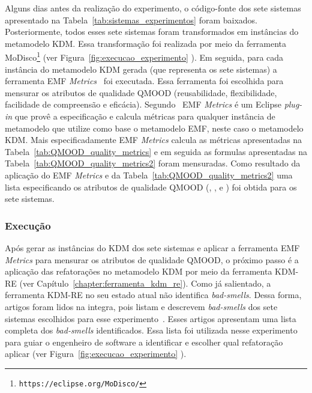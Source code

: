 Alguns dias antes da realização do experimento, o código-fonte dos sete sistemas apresentado na Tabela~\ref{tab:sistemas_experimentos} foram baixados. Posteriormente, todos esses sete sistemas foram transformados em instâncias do metamodelo KDM. Essa transformação foi realizada por meio da ferramenta MoDisco\footnote{\texttt{https://eclipse.org/MoDisco/}} (ver Figura~\ref{fig:execucao_experimento} ). Em seguida, para cada instância do metamodelo KDM gerada (que representa os sete sistemas) a ferramenta EMF \textit{Metrics}~\cite{Arendt_2012, Thorsten_2010_durelli} foi executada. Essa ferramenta foi escolhida para mensurar os atributos de qualidade QMOOD (reusabilidade, flexibilidade, facilidade de compreensão e eficácia). Segundo~ EMF \textit{Metrics} é um Eclipse \textit{plug-in} que provê a especificação e calcula métricas para qualquer instância de metamodelo que utilize como base o metamodelo EMF, neste caso o metamodelo KDM. Mais especificadamente EMF \textit{Metrics} calcula as métricas apresentadas na Tabela~\ref{tab:QMOOD_quality_metrics} e em seguida as formulas apresentadas na Tabela~\ref{tab:QMOOD_quality_metrics2} foram mensuradas. Como resultado da aplicação do EMF \textit{Metrics} e da Tabela~\ref{tab:QMOOD_quality_metrics2} uma lista especificando os atributos de qualidade QMOOD (, ,  e ) foi obtida para os sete sistemas.

\subsubsection{Execução}

Após gerar as instâncias do KDM dos sete sistemas e aplicar a ferramenta EMF \textit{Metrics} para mensurar os atributos de qualidade QMOOD, o próximo passo é a aplicação das refatorações no metamodelo KDM por meio da ferramenta KDM-RE (ver Capítulo~\ref{chapter:ferramenta_kdm_re}). Como já salientado, a ferramenta KDM-RE no seu estado atual não identifica \textit{bad-smells}. Dessa forma, artigos foram lidos na integra, pois listam e descrevem \textit{bad-smells} dos sete sistemas escolhidos para esse experimento~\cite{Kessentini_2011, Ouni_2013, Moha_2010, Kessentini_2010}. Esses artigos apresentam uma lista completa dos \textit{bad-smells} identificados. Essa lista foi utilizada nesse experimento para guiar o engenheiro de software a identificar e escolher qual refatoração aplicar (ver Figura~\ref{fig:execucao_experimento} ).

